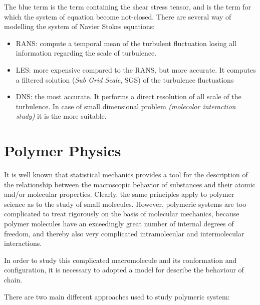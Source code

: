 The blue term is the term containing the shear stress tensor, and is the term for which the system of equation become not-closed. 
There are several way of modelling the system of Navier Stokes equations:
\begin{itemize}
 \item RANS: compute a temporal mean of the turbulent fluctuation losing all information regarding the scale of turbulence.
 \item LES: more expensive compared to the RANS, but more accurate.
 It computes a filtered solution (\emph{Sub Grid Scale}, SGS) of the turbulence fluctuations
 \item DNS: the most accurate. It performs a direct resolution of all scale of the turbulence. In case of small dimensional problem \textit{(molecolar interaction study)} it is the more suitable. 
\end{itemize}


\section{Polymer Physics}

It is well known that statistical mechanics provides a tool for the
description of the relationship between the macroscopic behavior of substances
and their atomic and/or molecular properties. Clearly, the same
principles apply to polymer science as to the study of small molecules.
However, polymeric systems are too complicated to treat rigorously on
the basis of molecular mechanics, because polymer molecules have an
exceedingly great number of internal degrees of freedom, and thereby
also very complicated intramolecular 
and intermolecular interactions.~\cite{yam} 

In order to study this complicated macromolecule and its conformation and configuration, it is necessary to adopted a model for describe the behaviour of chain.

There are two main different approaches used to study polymeric system:

